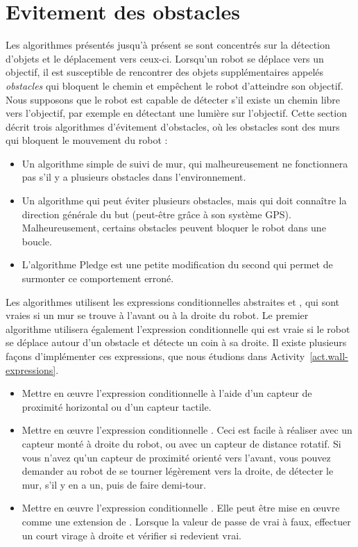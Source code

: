 \section{Evitement des obstacles}\label{s.obstacle-avoidance}

Les algorithmes présentés jusqu'à présent se sont concentrés sur la détection d'objets et le déplacement vers ceux-ci. Lorsqu'un robot se déplace vers un objectif, il est susceptible de rencontrer des objets supplémentaires appelés \emph{obstacles} qui bloquent le chemin et empêchent le robot d'atteindre son objectif. Nous supposons que le robot est capable de détecter s'il existe un chemin libre vers l'objectif, par exemple en détectant une lumière sur l'objectif. Cette section décrit trois algorithmes d'évitement d'obstacles, où les obstacles sont des murs qui bloquent le mouvement du robot :
\begin{itemize}
\item Un algorithme simple de suivi de mur, qui malheureusement ne fonctionnera pas s'il y a plusieurs obstacles dans l'environnement.
\item Un algorithme qui peut éviter plusieurs obstacles, mais qui doit connaître la direction générale du but (peut-être grâce à son système GPS). Malheureusement, certains obstacles peuvent bloquer le robot dans une boucle.
\item L'algorithme Pledge est une petite modification du second qui permet de surmonter ce comportement erroné.
\end{itemize}
Les algorithmes utilisent les expressions conditionnelles abstraites  et , qui sont vraies si un mur se trouve à l'avant ou à la droite du robot. Le premier algorithme utilisera également l'expression conditionnelle  qui est vraie si le robot se déplace autour d'un obstacle et détecte un coin à sa droite. Il existe plusieurs façons d'implémenter ces expressions, que nous étudions dans Activity~\ref{act.wall-expressions}.

\begin{framed}
\begin{itemize}
\item Mettre en œuvre l'expression conditionnelle  à l'aide d'un capteur de proximité horizontal ou d'un capteur tactile.
\item Mettre en œuvre l'expression conditionnelle . Ceci est facile à réaliser avec un capteur monté à droite du robot, ou avec un capteur de distance rotatif. Si vous n'avez qu'un capteur de proximité orienté vers l'avant, vous pouvez demander au robot de se tourner légèrement vers la droite, de détecter le mur, s'il y en a un, puis de faire demi-tour.
\item Mettre en œuvre l'expression conditionnelle . Elle peut être mise en œuvre comme une extension de . Lorsque la valeur de  passe de vrai à faux, effectuer un court virage à droite et vérifier si  redevient vrai.
\end{itemize}
\end{framed}


